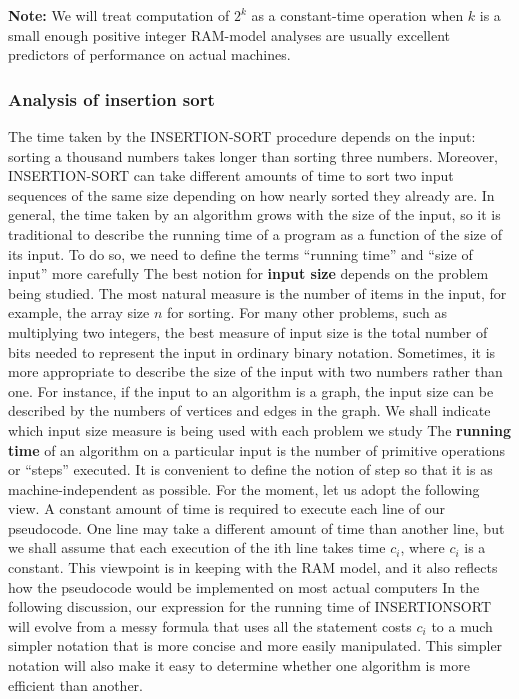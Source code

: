 \documentclass{report}
\begin{document}
    \bigbreak \noindent 
    \textbf{Note:} We will treat computation of $2^{k}$ as a constant-time operation when $k$ is a small enough positive integer
    \bigbreak \noindent 
    RAM-model analyses are usually excellent predictors of performance on actual machines.
    \bigbreak \noindent 
    \subsubsection{Analysis of insertion sort}
    \bigbreak \noindent 
    The time taken by the INSERTION-SORT procedure depends on the input: sorting a thousand numbers takes longer than sorting three numbers. Moreover, INSERTION-SORT can take different amounts of time to sort two input sequences of the same size depending on how nearly sorted they already are. In general, the time taken by an algorithm grows with the size of the input, so it is traditional to describe the running time of a program as a function of the size of its input. To do so, we need to define the terms “running time” and “size of input” more carefully
    \bigbreak \noindent 
    The best notion for \textbf{input size} depends on the problem being studied. The most natural measure is the number of items in the input, for example, the array size $n$ for sorting. For many other problems, such as multiplying two integers, the best measure of input size is the total number of bits needed to represent the input in ordinary binary notation. Sometimes, it is more appropriate to describe the size of the input with two numbers rather than one. For instance, if the input to an algorithm is a graph, the input size can be described by the numbers of vertices and edges in the graph. We shall indicate which input size measure is being used with each problem we study
    \bigbreak \noindent 
    The \textbf{running time} of an algorithm on a particular input is the number of primitive operations or “steps” executed. It is convenient to define the notion of step so that it is as machine-independent as possible. For the moment, let us adopt the following view. A constant amount of time is required to execute each line of our pseudocode. One line may take a different amount of time than another line, but we shall assume that each execution of the ith line takes time $c_{i}$, where $c_{i}$ is a constant. This viewpoint is in keeping with the RAM model, and it also reflects how the pseudocode would be implemented on most actual computers
    \bigbreak \noindent 
    In the following discussion, our expression for the running time of INSERTIONSORT will evolve from a messy formula that uses all the statement costs $c_{i}$ to a much simpler notation that is more concise and more easily manipulated. This simpler notation will also make it easy to determine whether one algorithm is more efficient than another.
\end{document}
